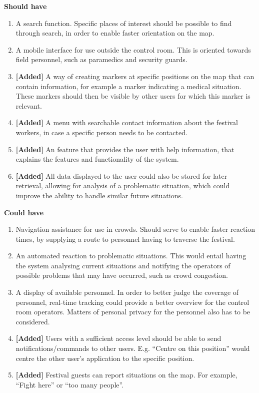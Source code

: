 \textbf{Should have}
\begin{enumerate}[resume]
    \item A search function. Specific places of interest should be possible to find through search, in order to enable faster orientation on the map.
    \item A mobile interface for use outside the control room. This is oriented towards field personnel, such as paramedics and security guards.
    \item \textbf{[Added]} A way of creating markers at specific positions on the map that can contain information, for example a marker indicating a medical situation. These markers should then be visible by other users for which this marker is relevant.
    \item \textbf{[Added]} A menu with searchable contact information about the festival workers, in case a specific person needs to be contacted.
    \item \textbf{[Added]} An feature that provides the user with help information, that explains the features and functionality of the system.
    \item \textbf{[Added]} All data displayed to the user could also be stored for later retrieval, allowing for analysis of a problematic situation, which could improve the ability to handle similar future situations.
\end{enumerate}

\textbf{Could have}
\begin{enumerate}[resume]
    \item Navigation assistance for use in crowds. Should serve to enable faster reaction times, by supplying a route to personnel having to traverse the festival.
    \item An automated reaction to problematic situations. This would entail having the system analysing current situations and notifying the operators of possible problems that may have occurred, such as crowd congestion.
    \item A display of available personnel. In order to better judge the coverage of personnel, real-time tracking could provide a better overview for the control room operators. Matters of personal privacy for the personnel also has to be considered.
    \item \textbf{[Added]} Users with a sufficient access level should be able to send notifications/commands to other users. E.g. \enquote{Centre on this position} would centre the other user's application to the specific position.
    \item \textbf{[Added]} Festival guests can report situations on the map. For example, \enquote{Fight here} or \enquote{too many people}.
\end{enumerate}

